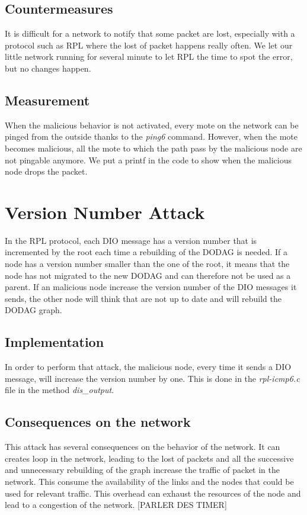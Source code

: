 \documentclass{report}
\begin{document}
\subsection*{Countermeasures}
It is difficult for a network to notify that some packet are lost, especially with a protocol such as RPL where the lost of packet happens really often. We let our little network running for several minute to let RPL the time to spot the error, but no changes happen.

\subsection*{Measurement }
When the malicious behavior is not activated, every mote on the network can be pinged from the outside thanks to the \textit{ping6} command. However, when the mote becomes malicious, all the mote to which the path pass by the malicious node are not pingable anymore. We put a printf in the code to show when the malicious node drops the packet. 
\section{Version Number Attack}
In the RPL protocol, each DIO message has a version number that is incremented by the root each time a rebuilding of the DODAG is needed. If a node has a version number smaller than the one of the root, it means that the node has not migrated to the new DODAG and can therefore not be used as a parent. If an malicious node increase the version number of the DIO messages it sends, the other node will think that are not up to date and will rebuild the DODAG graph.

\subsection*{Implementation}
In order to perform that attack, the malicious node, every time it sends a DIO message, will increase the version number by one. This is done in the \textit{rpl-icmp6.c} file in the method \textit{dis\_output}.

\subsection*{Consequences on the network}
This attack has several consequences on the behavior of the network. It can creates loop in the network, leading to the lost of packets and all the successive and unnecessary rebuilding of the graph increase the traffic of packet in the network. This consume the availability of the links and the nodes that could be used for relevant traffic. This overhead can exhaust the resources of the node and lead to a congestion of the network. 
[PARLER DES TIMER]
\end{document}
